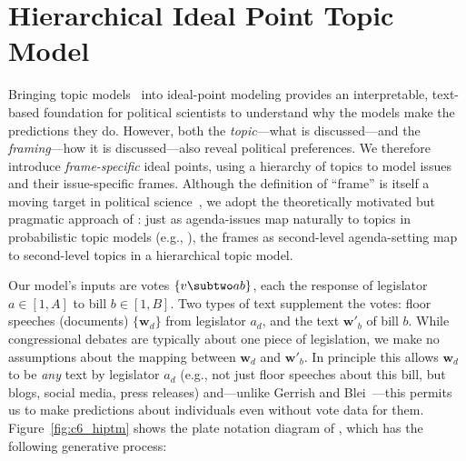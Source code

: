 
\section{Hierarchical Ideal Point Topic Model}
\label{sec:c6_model}


Bringing topic models~\cite{blei-09} into ideal-point modeling
provides an interpretable, text-based foundation for political
scientists to understand why the models make the predictions they
do. However, both the \emph{topic}---what is discussed---and the
\emph{framing}---how it is discussed---also reveal political
preferences. We therefore introduce \emph{frame-specific} ideal
points, using a hierarchy of topics to model issues and their
issue-specific frames. Although the definition of ``frame'' is itself
a moving target in political science~\cite{Entman:JC93}, we adopt the
theoretically motivated but pragmatic approach of
: just as agenda-issues map naturally to topics
in probabilistic topic models (e.g., ), the
frames as second-level agenda-setting \cite{McCombs:JS05} map to
second-level topics in a hierarchical topic model.

Our model's inputs are votes $\{v \subtwo ab\}$, each the response of
legislator $a \in [1,A]$ to bill $b \in [1,B]$. Two types of text
supplement the votes: floor speeches (documents) $\{\bm w_d\}$ from
legislator $a_d$, and the text $\bm w'_b$ of bill $b$.  While
congressional debates are typically about one piece of legislation,
we make no assumptions about the mapping between $\bm w_d$ and $\bm
w'_b$. In principle this allows $\bm w_d$ to be \emph{any} text by
legislator $a_d$ (e.g., not just floor speeches about this bill, but
blogs, social media, press releases) and---unlike Gerrish and
Blei~---this permits us to make predictions
about individuals even without vote data for
them. Figure~\ref{fig:c6_hiptm} shows the plate notation diagram of
\name{}, which has the following generative process:

